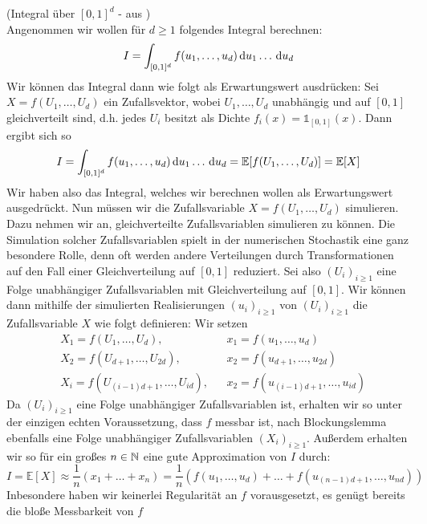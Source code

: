 \begin{Beispiel}(Integral über $ [0,1]^d $ - aus \cite{lapeyre2003introduction})\\
	\label{BeispielIntegral}
	Angenommen wir wollen für $ d \geq 1 $ folgendes Integral berechnen:
	\[
		I = \int_{[0,1]^d} f(u_1,\dots,u_d) \, \mathrm{d} u_1\dots\, \mathrm{d} u_d
	\]
	Wir können das Integral dann wie folgt als Erwartungswert ausdrücken:
	Sei $ X = f(U_1,\dots,U_d) $ ein 
	Zufallsvektor, wobei $ U_1,\dots,U_d $ unabhängig und auf $ [0,1] $ gleichverteilt sind, d.h. jedes $ U_i $ besitzt als Dichte $ f_i(x) = \mathds{1}_{[0,1]}(x) $.
	Dann ergibt sich so 
	\[
		I = \int_{[0,1]^d} f(u_1,\dots,u_d) \, \mathrm{d} u_1\dots\, \mathrm{d} u_d = \mathbb{E}[f(U_1,\dots,U_d)] = \mathbb{E}[X]
	\]
	Wir haben also das Integral, welches wir berechnen wollen als Erwartungswert ausgedrückt. Nun müssen wir die Zufallsvariable $ X = f(U_1,\dots,U_d) $ simulieren.
	Dazu nehmen wir an, gleichverteilte Zufallsvariablen simulieren zu können. Die Simulation solcher Zufallsvariablen spielt in der numerischen Stochastik eine ganz besondere Rolle, denn oft werden andere Verteilungen durch Transformationen auf den Fall einer Gleichverteilung auf $ [0,1] $ reduziert.
	Sei also $ (U_i)_{i \geq 1} $ eine Folge unabhängiger Zufallsvariablen mit Gleichverteilung auf $ [0,1] $. Wir können dann mithilfe der simulierten Realisierungen $ (u_i)_{i \geq 1} $  von $ (U_i)_{i \geq 1} $ die Zufallsvariable $ X $ wie folgt definieren: Wir setzen
	\begin{align*}
		&X_1 = f(U_1,\dots,U_d), & &x_1 = f(u_1,\dots,u_d) \\
		&X_2 = f(U_{d+1},\dots,U_{2d}), & &x_2 = f(u_{d+1},\dots,u_{2d}) \\
		&X_i = f(U_{(i-1)d+1},\dots,U_{id}), & &x_2 = f(u_{(i-1)d+1},\dots,u_{id})
	\end{align*}
	Da $ (U_i)_{i \geq 1} $ eine Folge unabhängiger Zufallsvariablen ist, erhalten wir so unter der einzigen echten Voraussetzung, dass $ f $ messbar ist, nach Blockungslemma ebenfalls eine Folge unabhängiger Zufallsvariablen $ (X_i)_{i \geq 1} $.
	Außerdem erhalten wir so für ein großes $ n \in \mathbb{N} $ eine gute Approximation von $ I $ durch:
	\[
		I = \mathbb{E}[X] \approx \frac{1}{n}(x_1+\dots+x_n) = \frac{1}{n} (f(u_1,\dots,u_d)+\dots+f(u_{(n-1)d+1},\dots,u_{nd}))
	\]	
	Inbesondere haben wir keinerlei Regularität an $ f $ vorausgesetzt, es genügt bereits die bloße Messbarkeit von $ f $
\end{Beispiel}



